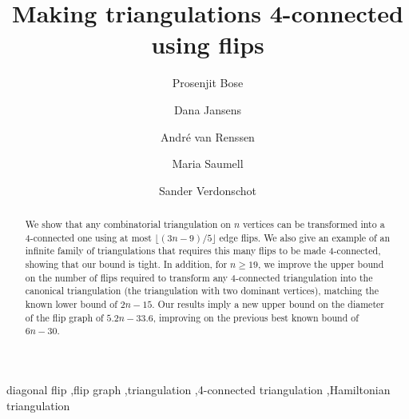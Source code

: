 \pdfoutput=1 \documentclass[12pt]{elsarticle}
\begin{document}
\begin{frontmatter}





\title{Making triangulations 4-connected using flips}


\author[carleton]{Prosenjit Bose}

\author[carleton]{Dana Jansens}

\author[carleton]{Andr\'e van Renssen}

\author[maria]{Maria Saumell}

\author[carleton]{Sander Verdonschot}

\address[carleton]{School of Computer Science, Carleton University, 5302 Herzberg Laboratories,\\
1125 Colonel By Drive, Ottawa, Ontario, K1S 5B6, Canada.}
\address[maria]{Computer Science Department, Universit\'e Libre de Bruxelles,\\
Boulevard du Triomphe - CP 212, 1050 Brussels, Belgium.}

\begin{abstract}
We show that any combinatorial triangulation on $n$ vertices can be transformed into a 4-connected one using at most $\lfloor(3n - 9)/5\rfloor$ edge flips. We also give an example of an infinite family of triangulations that requires this many flips to be made 4-connected, showing that our bound is tight. In addition, for $n \geq 19$, we improve the upper bound on the number of flips required to transform any 4-connected triangulation into the canonical triangulation (the triangulation with two dominant vertices), matching the known lower bound of $2n - 15$. Our results imply a new upper bound on the diameter of the flip graph of $5.2 n - 33.6$, improving on the previous best known bound of $6n - 30$.
\end{abstract}

\begin{keyword}
diagonal flip \sep flip graph \sep triangulation \sep 4-connected triangulation \sep Hamiltonian triangulation


\end{keyword}

\end{frontmatter}
\end{document}
